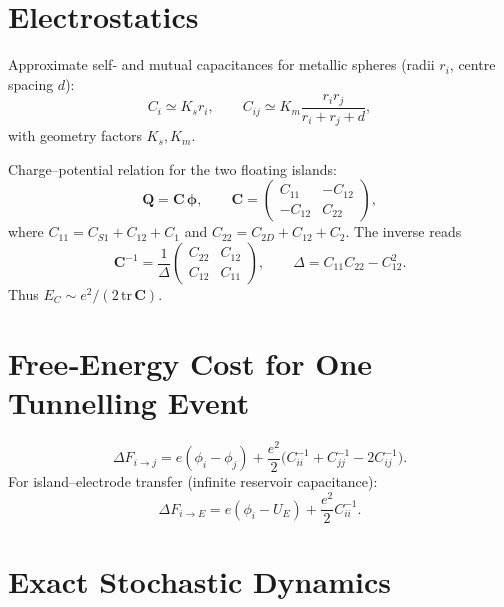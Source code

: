 \documentclass[11pt]{article}
\newcommand{\vect}[1]{\bm{#1}}
\begin{document}
\section{Electrostatics}
\label{sec:electrostatics}

Approximate self‑ and mutual capacitances for metallic spheres (radii $r_i$, centre spacing $d$):
\begin{equation}
    C_i \simeq K_s r_i, \qquad
    C_{ij} \simeq K_m \frac{r_i r_j}{r_i + r_j + d},
\end{equation}
with geometry factors $K_s,K_m$.

Charge–potential relation for the two floating islands:
\begin{equation}
    \vect{Q}=\mathbf C\,\bm{\phi},\qquad
    \mathbf C=\begin{pmatrix}C_{11}&-C_{12}\\-C_{12}&C_{22}\end{pmatrix},
    \label{eq:Cmatrix}
\end{equation}
where $C_{11}=C_{S1}+C_{12}+C_1$ and $C_{22}=C_{2D}+C_{12}+C_2$.  The inverse reads
\begin{equation}
 \mathbf C^{-1}=\frac1\Delta\begin{pmatrix}C_{22}&C_{12}\\C_{12}&C_{11}\end{pmatrix},\qquad
 \Delta=C_{11}C_{22}-C_{12}^2.
\end{equation}
Thus $E_C\sim e^2/(2\,\mathrm{tr}\,\mathbf C)$.

\section{Free‑Energy Cost for One Tunnelling Event}
\label{sec:free_energy}

\begin{equation}
    \boxed{\Delta F_{i\to j}=e(\phi_i-\phi_j)+\frac{e^2}{2}\bigl(C_{ii}^{-1}+C_{jj}^{-1}-2C_{ij}^{-1}\bigr)}.
\end{equation}
For island–electrode transfer (infinite reservoir capacitance):
\begin{equation}
    \Delta F_{i\to E}=e(\phi_i-U_E)+\frac{e^2}{2}C_{ii}^{-1}.
\end{equation}

\section{Exact Stochastic Dynamics}
\label{sec:master}
\end{document}
